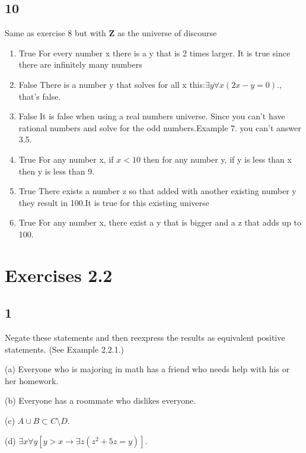 \documentclass{article}
\begin{document}
\subsection{10}
Same as exercise 8 but with $\mathbf{Z}$ as the universe of discourse
\begin{enumerate}[label=(\alph*)]
    \item 
    True For every number x there is a y that is 2 times larger. It is true since there are infinitely many numbers
    \item
    False There is a number y that solves for all x this:$\exists y \forall x(2x - y = 0).$, that's false. 
    \item
    False It is false when using a real numbers universe. Since you can't have rational numbers and solve for the odd numbers.Example 7. you can't answer 3.5.
    \item
    True For any number x, if $x<10$ then for any number y, if y is less than x then y is less than 9.
    \item
    True There exists a number z so that added with another existing number y they result in 100.It is true for this existing universe
    \item
    True For any number x, there exist a y that is bigger and a z that adds up to 100.
\end{enumerate}
\section{Exercises 2.2}
\subsection{1}
Negate these statements and then reexpress the results as equivalent
positive statements. (See Example 2.2.1.)

(a) Everyone who is majoring in math has a friend who needs help with
his or her homework.

(b) Everyone has a roommate who dislikes everyone.

(c) $A \cup B \subset C \setminus D$.

(d) $\exists x\forall y[y > x \rightarrow \exists z(z^2+ 5z = y)]$.
\end{document}
